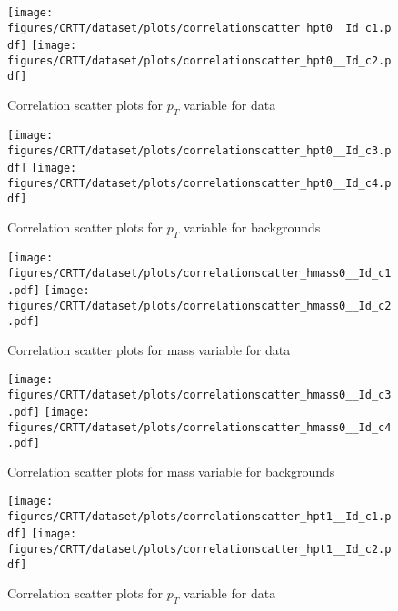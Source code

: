 \begin{figure}[!htb]%
\centering
\texttt{[image: figures/CRTT/dataset/plots/correlationscatter\_hpt0\_\_Id\_c1.pdf]}
\texttt{[image: figures/CRTT/dataset/plots/correlationscatter\_hpt0\_\_Id\_c2.pdf]}
\caption{ Correlation scatter plots for \HZZ $p_{T}$  variable for data}%
\label{fig:correlations_CRTT_hpt0_S}                                                       
\end{figure}\clearpage



\begin{figure}[!htb]%
\centering
\texttt{[image: figures/CRTT/dataset/plots/correlationscatter\_hpt0\_\_Id\_c3.pdf]}
\texttt{[image: figures/CRTT/dataset/plots/correlationscatter\_hpt0\_\_Id\_c4.pdf]}
\caption{ Correlation scatter plots for \HZZ $p_{T}$ variable for backgrounds}%
\label{fig:correlations_CRTT_hpt0_BG}                                                       
\end{figure}\clearpage


\begin{figure}[!htb]%
\centering
\texttt{[image: figures/CRTT/dataset/plots/correlationscatter\_hmass0\_\_Id\_c1.pdf]}
\texttt{[image: figures/CRTT/dataset/plots/correlationscatter\_hmass0\_\_Id\_c2.pdf]}
\caption{ Correlation scatter plots for \HZZ mass  variable for data}%
\label{fig:correlations_CRTT_hmass0_S}                                                       
\end{figure}\clearpage



\begin{figure}[!htb]%
\centering
\texttt{[image: figures/CRTT/dataset/plots/correlationscatter\_hmass0\_\_Id\_c3.pdf]}
\texttt{[image: figures/CRTT/dataset/plots/correlationscatter\_hmass0\_\_Id\_c4.pdf]}
\caption{ Correlation scatter plots for \HZZ mass variable for backgrounds}%
\label{fig:correlations_CRTT_hmass0_BG}                                                       
\end{figure}\clearpage




\begin{figure}[!htb]%
\centering
\texttt{[image: figures/CRTT/dataset/plots/correlationscatter\_hpt1\_\_Id\_c1.pdf]}
\texttt{[image: figures/CRTT/dataset/plots/correlationscatter\_hpt1\_\_Id\_c2.pdf]}
\caption{ Correlation scatter plots for \HBB $p_{T}$  variable for data}%
\label{fig:correlations_CRTT_hpt1_S}                                                       
\end{figure}\clearpage



